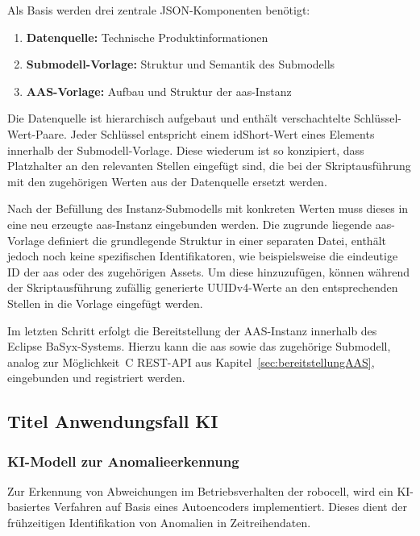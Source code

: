 Als Basis werden drei zentrale JSON-Komponenten benötigt:

\begin{enumerate}[noitemsep, leftmargin=*, label=\textbf{\arabic*.}]
    \item \textbf{Datenquelle:} Technische Produktinformationen
    \item \textbf{Submodell-Vorlage:} Struktur und Semantik des Submodells
    \item \textbf{AAS-Vorlage:} Aufbau und Struktur der \acs{aas}-Instanz
\end{enumerate}

Die Datenquelle ist hierarchisch aufgebaut und enthält verschachtelte Schlüssel-Wert-Paare. 
Jeder Schlüssel entspricht einem idShort-Wert eines Elements innerhalb der Submodell-Vorlage. 
Diese wiederum ist so konzipiert, dass Platzhalter an den relevanten Stellen eingefügt sind, die bei der Skriptausführung mit den zugehörigen Werten aus der Datenquelle ersetzt werden.

Nach der Befüllung des Instanz-Submodells mit konkreten Werten muss dieses in eine neu erzeugte \acs{aas}-Instanz eingebunden werden.
Die zugrunde liegende \acs{aas}-Vorlage definiert die grundlegende Struktur in einer separaten Datei, enthält jedoch noch keine spezifischen Identifikatoren, wie beispielsweise die eindeutige ID der \acs{aas} oder des zugehörigen Assets.
Um diese hinzuzufügen, können während der Skriptausführung zufällig generierte UUIDv4-Werte an den entsprechenden Stellen in die Vorlage eingefügt werden.

Im letzten Schritt erfolgt die Bereitstellung der AAS-Instanz innerhalb des Eclipse BaSyx-Systems. 
Hierzu kann die \acs{aas} sowie das zugehörige Submodell, analog zur Möglichkeit~C REST-API aus Kapitel~\ref{sec:bereitstellungAAS}, eingebunden und registriert werden.

\subsection{Titel Anwendungsfall KI}

\subsubsection{KI-Modell zur Anomalieerkennung}
Zur Erkennung von Abweichungen im Betriebsverhalten der robocell, wird ein KI-basiertes Verfahren auf Basis eines Autoencoders implementiert.
Dieses dient der frühzeitigen Identifikation von Anomalien in Zeitreihendaten.


